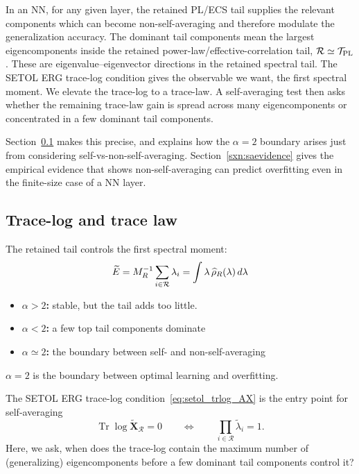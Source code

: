 \documentclass[10pt,twocolumn]{article}
\newcommand{\Tr}{\operatorname{Tr}}
\newcommand{\Xtilde}{\widetilde{\mathbf X}}
\newcommand{\Rell}{\mathcal R}
\newcommand{\takeaway}[1]{%
  \par\vspace{4pt}\noindent\textcolor{boxblue}{#1}%
}
\newcommand{\eqtight}[1]{\[\vspace{-1pt}#1\vspace{-3pt}\]}
\begin{document}
In an NN, for any given layer, the retained PL/ECS tail supplies the relevant components which can become
non-self-averaging and therefore modulate the generalization accuracy.
The dominant tail components mean the largest eigencomponents inside the retained power-law/effective-correlation tail, $\mathcal R\simeq\mathcal T_{\rm PL}$.
These are eigenvalue--eigenvector directions in the retained spectral tail.
The SETOL ERG trace-log condition gives the observable we want, the first spectral moment.
We elevate the trace-log to a trace-law. 
A self-averaging test then asks whether the remaining trace-law gain is spread across many eigencomponents or
concentrated in a few dominant tail components.

Section~\ref{sxn:tracelog} makes this precise, and explains how the $\alpha=2$ boundary arises
just from considering self-vs-non-self-averaging.
Section~\ref{sxn:saevidence} gives the empirical evidence that shows non-self-averaging
can predict overfitting even in the finite-size case of a NN layer.

\clearpage
\subsection{Trace-log and trace law}
\label{sxn:tracelog}
\begin{tcolorbox}[marginalbox,title=\textbf{6. Why $\alpha\simeq2$ is optimal}]
  The retained tail controls the first spectral moment:
    \eqtight{
      \widetilde E=M_R^{-1}\sum_{i\in\mathcal R}\lambda_i=\int \lambda\,\widehat\rho_R(\lambda)\,d\lambda
      }
\begin{itemize}
\item \textbf{$\alpha>2$:} stable, but the tail adds too little.
\item \textbf{$\alpha<2$:} a few top tail components dominate
\item \textbf{$\alpha\simeq2$:} the boundary between self- and non-self-averaging
\end{itemize}
\takeaway{$\alpha=2$ is the boundary between optimal learning and overfitting.}
  \end{tcolorbox}


The SETOL ERG trace-log condition~\eqref{eq:setol_trlog_AX} is the entry point for self-averaging
\begin{equation}                                                                                                                                         
\Tr\log\Xtilde_{\Rell}=0                                                                                                                                 
\qquad\Longleftrightarrow\qquad                                                                                                                          
\prod_{i\in\mathcal R}\widetilde\lambda_i=1.                                                                                                             
\end{equation} 
Here, we ask, when does the trace-log contain the maximum number of (generalizing) eigencomponents before
a few dominant tail components control it?
\end{document}
